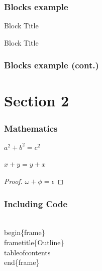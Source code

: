 \documentclass[aspectratio=169]{beamer}
\begin{document}
\begin{frame}
    \frametitle{Blocks example}
    \begin{block}{Block Title}
        \lipsum[6][1-4]
    \end{block}
    \begin{alertblock}{Block Title}
        \lipsum[6][5-8]
    \end{alertblock}
\end{frame}

\begin{frame}
    \frametitle{Blocks example (cont.)}
    \begin{definition}
        \lipsum[7][1-4]
    \end{definition}
    \begin{example}
        \lipsum[7][5-8]
    \end{example}
\end{frame}

\section{Section 2}

\framesection

\begin{frame}
    \frametitle{Mathematics}
    \begin{theorem}[Pythagoras] 
        $ a^2 + b^2 = c^2$
    \end{theorem}
    \begin{corollary}
        $ x + y = y + x  $
    \end{corollary}
    \pause
    \begin{proof}
        $\omega +\phi = \epsilon $
    \end{proof}
\end{frame}

\begin{frame}[fragile]
    \frametitle{Including Code}
    \begin{semiverbatim}
\\begin\{frame\}
    \\frametitle\{Outline\}
    \\tableofcontents
\\end\{frame\}
    \end{semiverbatim}
\end{frame}
\end{document}

